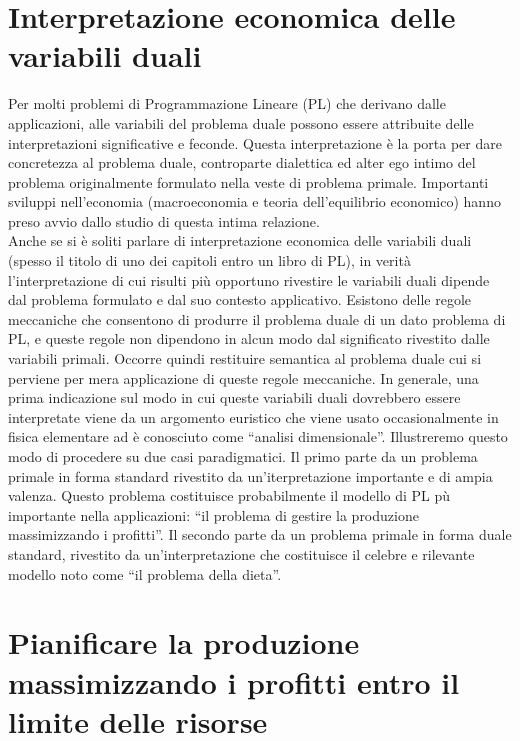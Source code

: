 \documentclass[a4paper,11pt]{article}
\date{}
\begin{document}
	
	\section*{Interpretazione economica delle variabili duali}
	
	Per molti problemi di Programmazione Lineare (PL)
        che derivano dalle applicazioni,
        alle variabili del problema duale possono essere attribuite delle interpretazioni significative e feconde.
        Questa interpretazione \`e la porta per dare concretezza al problema duale, controparte dialettica ed alter ego intimo del problema originalmente formulato nella veste di problema primale. Importanti sviluppi nell'economia (macroeconomia e teoria dell'equilibrio economico) hanno preso avvio dallo studio di questa intima relazione.\\
        
        Anche se si \`e soliti parlare di interpretazione economica delle variabili duali (spesso il titolo di uno dei capitoli entro un libro di PL),
        in verit\`a l'interpretazione di cui risulti pi\`u opportuno rivestire le variabili duali dipende dal problema formulato e dal suo contesto applicativo.
        Esistono delle regole meccaniche che consentono di produrre il problema duale di un dato problema di PL, e queste regole non dipendono in alcun modo dal significato rivestito dalle variabili primali.
        Occorre quindi restituire semantica al problema duale cui si perviene per mera applicazione di queste regole meccaniche. 
        In generale, una prima indicazione sul modo in cui queste variabili duali dovrebbero essere interpretate viene da un argomento euristico che viene usato occasionalmente in fisica elementare ad è conosciuto come ``analisi dimensionale''.
        Illustreremo questo modo di procedere su due casi paradigmatici. Il primo parte da un problema primale in forma standard rivestito da un'iterpretazione importante e di ampia valenza. Questo problema costituisce probabilmente il modello di PL p\`u importante nella applicazioni: ``il problema di gestire la produzione massimizzando i profitti''. Il secondo parte da un problema primale in forma duale standard, rivestito da un'interpretazione che costituisce il celebre e rilevante modello noto come ``il problema della dieta''.\\

	\section*{Pianificare la produzione massimizzando i profitti entro il limite delle risorse}
      
\end{document}

